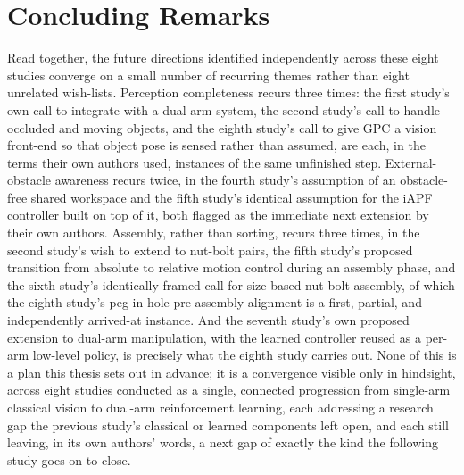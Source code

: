 \section{Concluding Remarks}\label{sec:concl_remarks}

Read together, the future directions identified independently across these eight studies converge
on a small number of recurring themes rather than eight unrelated wish-lists. Perception
completeness recurs three times: the first study's own call to integrate with a dual-arm system, the
second study's call to handle occluded and moving objects, and the eighth study's call to give GPC
a vision front-end so that object pose is sensed rather than assumed, are each, in the terms their
own authors used, instances of the same unfinished step. External-obstacle awareness recurs twice,
in the fourth study's assumption of an obstacle-free shared workspace and the fifth study's identical
assumption for the iAPF controller built on top of it, both flagged as the immediate next extension
by their own authors. Assembly, rather than sorting, recurs three times, in the second study's wish
to extend to nut-bolt pairs, the fifth study's proposed transition from absolute to relative motion
control during an assembly phase, and the sixth study's identically framed call for size-based
nut-bolt assembly, of which the eighth study's peg-in-hole pre-assembly alignment is a first,
partial, and independently arrived-at instance. And the seventh study's own proposed extension to
dual-arm manipulation, with the learned controller reused as a per-arm low-level policy, is precisely
what the eighth study carries out. None of this is a plan this thesis sets out in advance; it is a
convergence visible only in hindsight, across eight studies conducted as a single, connected
progression from single-arm classical vision to dual-arm reinforcement learning, each addressing a
research gap the previous study's classical or learned components left open, and each still leaving,
in its own authors' words, a next gap of exactly the kind the following study goes on to close.
